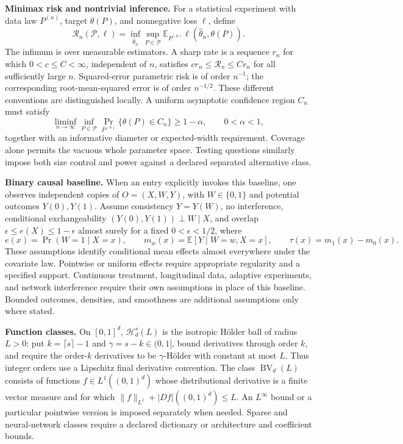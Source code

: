 \documentclass[11pt,a4paper]{article}
\newcommand{\E}{\mathbb E}
\begin{document}
\textbf{Minimax risk and nontrivial inference.}
For a statistical experiment with data law $P^{(n)}$, target $\theta(P)$,
and nonnegative loss $\ell$, define
\[
 \mathcal R_n(\mathcal P,\ell)
   =\inf_{\widehat\theta_n}\sup_{P\in\mathcal P}
      \E_{P^{(n)}}\ell(\widehat\theta_n,\theta(P)).
\]
The infimum is over measurable estimators. A sharp rate is a sequence
$r_n$ for which $0<c\leq C<\infty$, independent of $n$, satisfies
$c r_n\leq\mathcal R_n\leq C r_n$ for all sufficiently large $n$.
Squared-error parametric risk is of order $n^{-1}$; the corresponding
root-mean-squared error is of order $n^{-1/2}$. These different conventions
are distinguished locally. A uniform asymptotic confidence region $C_n$
must satisfy
\[
 \liminf_{n\to\infty}\inf_{P\in\mathcal P}
     \Pr_{P^{(n)}}\{\theta(P)\in C_n\}\geq 1-\alpha,
 \qquad 0<\alpha<1,
\]
together with an informative diameter or expected-width requirement.
Coverage alone permits the vacuous whole parameter space. Testing questions
similarly impose both size control and power against a declared separated
alternative class.

\textbf{Binary causal baseline.}
When an entry explicitly invokes this baseline, one observes independent
copies of $O=(X,W,Y)$, with $W\in\{0,1\}$ and potential outcomes $Y(0),Y(1)$.
Assume consistency $Y=Y(W)$, no interference, conditional exchangeability
$(Y(0),Y(1))\perp W\mid X$, and overlap
$\epsilon\leq e(X)\leq1-\epsilon$ almost surely for a fixed
$0<\epsilon<1/2$, where
\[
 e(x)=\Pr(W=1\mid X=x),\qquad
 m_w(x)=\E[Y\mid W=w,X=x],\qquad
 \tau(x)=m_1(x)-m_0(x).
\]
These assumptions identify conditional mean effects almost everywhere
under the covariate law. Pointwise or uniform effects require appropriate
regularity and a specified support. Continuous treatment, longitudinal
data, adaptive experiments, and network interference require their own
assumptions in place of this baseline. Bounded outcomes, densities, and
smoothness are additional assumptions only where stated.

\textbf{Function classes.}
On $[0,1]^d$, $\mathcal H_d^s(L)$ is the isotropic Hölder ball of radius
$L>0$: put $k=\lceil s\rceil-1$ and $\gamma=s-k\in(0,1]$, bound derivatives
through order $k$, and require the order-$k$ derivatives to be
$\gamma$-Hölder with constant at most $L$. Thus integer orders use a
Lipschitz final derivative convention. The class
$\operatorname{BV}_d(L)$ consists of functions $f\in L^1((0,1)^d)$ whose
distributional derivative is a finite vector measure and for which
$\|f\|_{L^1}+|Df|((0,1)^d)\leq L$.
An $L^\infty$ bound or a particular pointwise version is imposed separately
when needed. Sparse and neural-network classes require a declared
dictionary or architecture and coefficient bounds.
\end{document}
